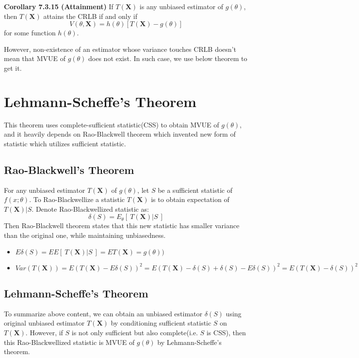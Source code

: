 \documentclass[10pt]{article}
\begin{document}
\textbf{Corollary 7.3.15 (Attainment)} If $T(\textbf{X})$ is any unbiased estimator of $g(\theta)$, then $T(\textbf{X})$ attains the CRLB if and only if
$$
V(\theta, \textbf{X})=h(\theta)[T(\textbf{X})-g(\theta)]
$$
for some function $h(\theta)$.\bigskip

\noindent However, non-existence of an estimator whose variance touches CRLB doesn't mean that MVUE of $g(\theta)$ does not exist. In such case, we use below theorem to get it.

\section{Lehmann-Scheffe's Theorem}
This theorem uses complete-sufficient statistic(CSS) to obtain MVUE of $g(\theta)$, and it heavily depends on Rao-Blackwell theorem which invented new form of statistic which utilizes sufficient statistic.

\subsection{Rao-Blackwell's Theorem}
For any unbiased estimator $T(\textbf{X})$ of $g(\theta)$, let $S$ be a sufficient statistic of $f(x;\theta)$. To Rao-Blackwellize a statistic $T(\textbf{X})$ is to obtain expectation of $T(\textbf{X})|S$. Denote Rao-Blackwellized statistic as: $$\delta(S)=E_{\theta}[\ T(\textbf{X})|S\ ]$$ Then Rao-Blackwell theorem states that this new statistic has smaller variance than the original one, while maintaining unbiasedness.
\begin{itemize}
\item $E\delta(S)=EE[\ T(\textbf{X})|S\ ]=ET(\textbf{X})=g(\theta))$
\item $Var(T(\textbf{X}))=E(T(\textbf{X})-E\delta(S))^2=E(T(\textbf{X})-\delta(S)+\delta(S)-E\delta(S))^2=E(T(\textbf{X})-\delta(S))^2+Var(\delta(S))$
\end{itemize}

\subsection{Lehmann-Scheffe's Theorem}
To summarize above content, we can obtain an unbiased estimator $\delta(S)$ using original unbiased estimator $T(\textbf{X})$ by conditioning sufficient statistic $S$ on $T(\textbf{X})$. However, if $S$ is not only sufficient but also complete(i.e. $S$ is CSS), then this Rao-Blackwellized statistic is MVUE of $g(\theta)$ by Lehmann-Scheffe's theorem.
\end{document}
